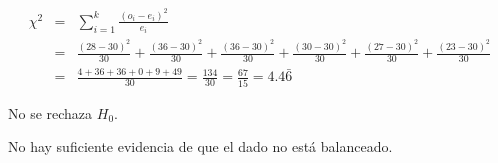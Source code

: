 \begin{solucion}
 \begin{estadistico}
  \begin{eqnarray*}
   \chi^2 & = & \sum_{i=1}^k \frac{\left( o_i - e_i \right)^2}{e_i} \\
   & = & \frac{(28 - 30)^2}{30} + \frac{(36-30)^2}{30} + \frac{(36 - 30)^2}{30}
   + \frac{(30 - 30)^2}{30} + \frac{(27-30)^2}{30} + \frac{(23 - 30)^2}{30} \\
   & = & \frac{4 + 36 + 36 + 0 + 9 + 49}{30} = \frac{134}{30}
   = \frac{67}{15} = 4.4\bar{6}
  \end{eqnarray*}
 \end{estadistico}

 \begin{decision}
  No se rechaza $H_0$.
 \end{decision}

 \begin{conclusion}
  No hay suficiente evidencia de que el dado no est\'a balanceado.
 \end{conclusion}


\end{solucion}
